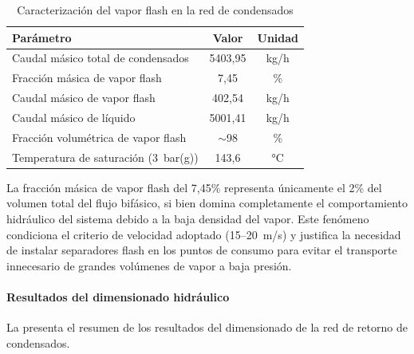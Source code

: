 \begin{table}[H]
	\centering
	\caption{Caracterización del vapor flash en la red de condensados}
	\label{tab:conclusiones-vapor-flash}
	\begin{tabular}{lcc}
		\toprule
		\textbf{Parámetro}                   & \textbf{Valor} & \textbf{Unidad} \\
		\midrule
		Caudal másico total de condensados   & 5403,95        & kg/h            \\
		Fracción másica de vapor flash       & 7,45           & \%              \\
		Caudal másico de vapor flash         & 402,54         & kg/h            \\
		Caudal másico de líquido             & 5001,41        & kg/h            \\
		\midrule
		Fracción volumétrica de vapor flash  & $\sim$98       & \%              \\
		Temperatura de saturación (3~bar(g)) & 143,6          & °C              \\
		\bottomrule
	\end{tabular}
\end{table}

La fracción másica de vapor flash del 7,45\% representa únicamente el 2\% del volumen total del flujo bifásico, si bien domina completamente el comportamiento hidráulico del sistema debido a la baja densidad del vapor. Este fenómeno condiciona el criterio de velocidad adoptado (15--20~m/s) y justifica la necesidad de instalar separadores flash en los puntos de consumo para evitar el transporte innecesario de grandes volúmenes de vapor a baja presión.

\paragraph{Resultados del dimensionado hidráulico}

La  presenta el resumen de los resultados del dimensionado de la red de retorno de condensados.

